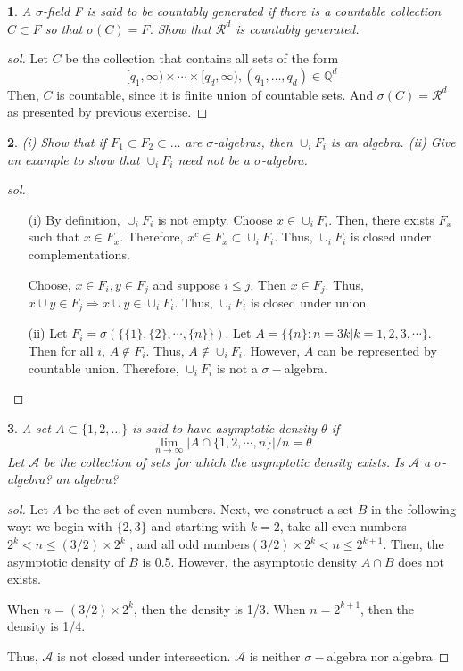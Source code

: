 \documentclass{report}
\newtheorem{ex}{}[section]
\begin{document}
\begin{ex}
A $\sigma$-field F is said to be countably generated if there is a countable collection $C \subset F$ so that $\sigma(C) = F$. Show that $\mathcal{R}^d$ is countably generated.
\end{ex}
\begin{proof}[sol]
Let $C$ be the collection that contains all sets of the form
\[[q_1,\infty)\times \dotsb\times[q_d,\infty), (q_1,\dotsc,q_d) \in \mathbb{Q}^d\]
Then, $C$ is countable, since it is finite union of countable sets. And $\sigma(C) = \mathcal{R}^d$ as presented by previous exercise.
\end{proof}
\begin{ex}
(i) Show that if $F_1 \subset F_2 \subset \dotsc $ are $\sigma$-algebras, then $\cup_i{F}_i$ is an algebra. (ii) Give an example to show that $\cup_iF_i$ need not be a $\sigma$-algebra.
\end{ex}
\begin{proof}[sol]~
\begin{enumerate}
    \item[(i)] By definition, $\cup_i F_i$ is not empty.
    Choose $x \in \cup_i F_i$. Then, there exists $F_x$ such that $x \in F_x$. Therefore, $x^c \in F_x \subset \cup_i F_i$. Thus, $\cup_i F_i$ is closed under complementations.
    
    Choose, $x \in F_i, y \in F_j$ and suppose $i\le j$. Then $x \in F_j$. Thus, $x \cup y \in F_j \Rightarrow x \cup y \in \cup_i F_i$.  Thus, $\cup_i F_i$ is closed under union.
    \item[(ii)] Let $F_i = \sigma(\{\{1\},\{2\},\dotsb,\{n\}\})$. Let $A = \{\{n\} : n = 3k| k = 1,2,3,\dotsb\}$. Then for all $i$, $A \notin F_i$. Thus, $A \not\in \cup_i F_i$. However, $A$ can be represented by countable union. Therefore, $\cup_iF_i$ is not a $\sigma-$algebra.
\end{enumerate}
\end{proof}
\begin{ex}
A set $A \subset \{1, 2, \dotsc \}$ is said to have asymptotic density $\theta$ if
\[\lim_{n\to\infty} |A \cap \{1, 2,\dotsb , n\}|/n = \theta\]
Let $\mathcal{A}$ be the collection of sets for which the asymptotic density exists.
Is $\mathcal{A}$ a $\sigma$-algebra? an algebra?
\end{ex}
\begin{proof}[sol]
Let $A$ be the set of even numbers. Next, we construct a set $B$ in the following way: we begin with $\{2, 3\}$ and starting with $k = 2$, take all even numbers $2^k < n \le (3/2) \times 2^k$
, and all odd numbers$(3/2) \times 2^k < n \le 2^{k+1}$. Then, the asymptotic density of $B$ is 0.5. However, the asymptotic density $A\cap B$ does not exists.

When $n = (3/2)\times 2^k$, then the density is 1/3. When $n = 2^{k+1}$, then the density is 1/4.

Thus, $\mathcal{A}$ is not closed under intersection. $\mathcal{A}$ is neither $\sigma-$algebra nor algebra
\end{proof}
\end{document}
